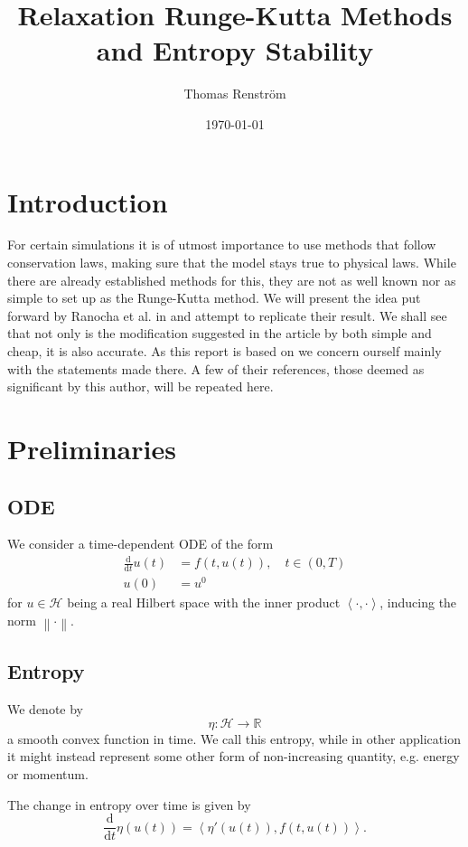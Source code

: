 \documentclass{article}
\title{Relaxation Runge-Kutta Methods and Entropy Stability}
\author{Thomas Renström}
\date{\today}
\newcommand{\norm}[1]{\left\lVert#1\right\rVert}
\newcommand{\inner}[2]{\left< #1 , #2 \right>}
\begin{document}
\maketitle
\section{Introduction}

For certain simulations it is of utmost importance to use methods that follow conservation laws, making sure that the model stays true to physical laws. While there are already established methods for this, they are not as well known nor as simple to set up as the Runge-Kutta method. We will present the idea put forward by Ranocha et al. in \cite{Ranocha_2020} and attempt to replicate their result. We shall see that not only is the modification suggested in the article by both simple and cheap, it is also accurate.
As this report is based on \cite{Ranocha_2020} we concern ourself mainly with the statements made there. A few of their references, those deemed as significant by this author, will be repeated here.

\section{Preliminaries}
\subsection{ODE}
    We consider a time-dependent ODE of the form
    \begin{align*}
        \frac{\text{d}}{\text{d}t} u(t) &= f(t, u(t)), \quad t \in (0, T)\\
        u(0) &= u^0
    \end{align*}
    for \(u \in \mathcal{H}\) being a real Hilbert space with the inner product \(\inner{\cdot}{\cdot}\), inducing the norm \(\norm{\cdot}\).


\subsection{Entropy}
    We denote by
    \[ \eta: \mathcal{H} \rightarrow \mathbb{R}\]
    a smooth convex function in time.
    We call this entropy, while in other application it might instead represent some other form of non-increasing quantity, e.g. energy or momentum.

    The change in entropy over time is given by
    \[\frac{\text{d}}{\text{d}t} \eta (u(t)) = \inner{\eta'(u(t))}{f(t, u(t))}.\]
\end{document}
